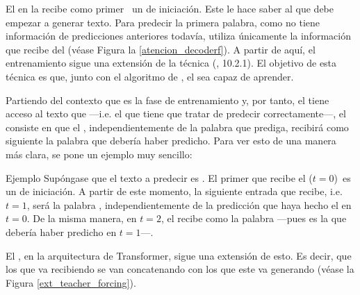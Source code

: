 El  en la  recibe como primer \fnm\ un  de iniciación\fnm. Este  le hace saber al  que debe empezar a generar texto. Para predecir la primera palabra, como no tiene información de predicciones anteriores todavía, utiliza únicamente la información que recibe del  (véase Figura la \ref{atencion_decoderf}). A partir de aquí, el entrenamiento sigue una extensión de la técnica  (\cite{deepLearningBook}, 10.2.1). El objetivo de esta técnica es que, junto con el algoritmo de , el  sea capaz de aprender. 

Partiendo del contexto que es la fase de entrenamiento y, por tanto, el  tiene acceso al texto que  ---i.e. el que tiene que tratar de predecir correctamente---, el  consiste en que el , independientemente de la palabra que prediga, recibirá como siguiente  la palabra que debería haber predicho. Para ver esto de una manera más clara, se pone un ejemplo muy sencillo:

\begin{ejemploDos}{Ejemplo }
Supóngase que el texto a predecir es \ul{}. El primer  que recibe el  ($t=0$)\fnm\ es un  de iniciación. A partir de este momento, la siguiente entrada que recibe, i.e. $t = 1$, será la palabra \ul{}, independientemente de la predicción que haya hecho el  en $t=0$. De la misma manera,  en $t= 2$, el  recibe como  la palabra \ul{} ---pues es la que debería haber predicho en $t = 1$---.
\end{ejemploDos}

El , en la arquitectura de Transformer, sigue una extensión de esto. Es decir, que los  que va recibiendo se van concatenando con los  que este va generando (véase la Figura \ref{ext_teacher_forcing}).

